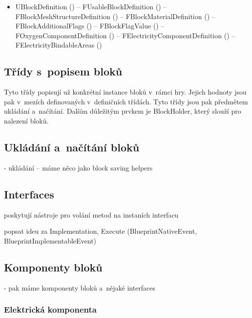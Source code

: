 \begin{itemize}
	\item UBlockDefinition ()
		\subitem -- FUsableBlockDefinition ()
		\subitem -- FBlockMeshStructureDefinition ()
			\subsubitem -- FBlockMaterialDefinition ()
		\subitem -- FBlockAdditionalFlags ()
			\subsubitem -- FBlockFlagValue ()	
		\subitem -- FOxygenComponentDefinition ()
		\subitem -- FElectricityComponentDefinition ()
			\subsubitem -- FElectricityBindableAreas ()	
				
		

\end{itemize}

\subsection{Třídy s~popisem bloků}
Tyto třídy popisují už konkrétní instance bloků v~rámci hry. Jejich hodnoty jsou pak v~mezích definovaných v~definičních třídách. Tyto třídy jsou pak předmětem ukládání a~načítání. Dalším důležitým prvkem je BlockHolder, který slouží pro nalezení bloků. 

\subsection{Ukládání a~načítání bloků}

- ukládání -- máme něco jako block saving helpers


\subsection{Interfaces}
poskytují nástroje pro volání metod na instaních interfacu

popsat ideu za Implementation, Execute (BlueprintNativeEvent, BlueprintImplementableEvent)

\subsection{Komponenty bloků}
- pak máme komponenty bloků a~nějaké interfaces

\subsubsection{Elektrická komponenta}


